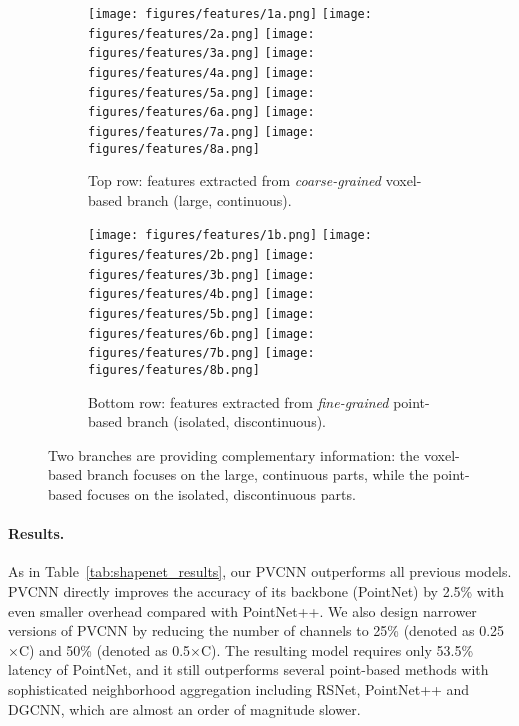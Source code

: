 \documentclass{article}
\newcommand{\tab}[1]{Table~\ref{#1}}
\newcommand{\myparagraph}[1]{\vspace{-6pt}\paragraph{#1}}
\def\modelshort{PVCNN\xspace}
\begin{document}
 \begin{figure}[!t]
\centering
\begin{subfigure}[b]{\linewidth}
    \centering
    \caption{Top row: features extracted from \emph{coarse-grained} voxel-based branch (large, continuous).}
    \texttt{[image: figures/features/1a.png]}
    \texttt{[image: figures/features/2a.png]}
    \texttt{[image: figures/features/3a.png]}
    \texttt{[image: figures/features/4a.png]}
    \texttt{[image: figures/features/5a.png]}
    \texttt{[image: figures/features/6a.png]}
    \texttt{[image: figures/features/7a.png]}
    \texttt{[image: figures/features/8a.png]}
\end{subfigure}
\begin{subfigure}[b]{\linewidth}
    \centering
    \texttt{[image: figures/features/1b.png]}
    \texttt{[image: figures/features/2b.png]}
    \texttt{[image: figures/features/3b.png]}
    \texttt{[image: figures/features/4b.png]}
    \texttt{[image: figures/features/5b.png]}
    \texttt{[image: figures/features/6b.png]}
    \texttt{[image: figures/features/7b.png]}
    \texttt{[image: figures/features/8b.png]}
    \caption{Bottom row: features extracted from \emph{fine-grained} point-based branch (isolated, discontinuous).}
\end{subfigure}
\caption{Two branches are providing complementary information: the voxel-based branch focuses on the large, continuous parts, while the point-based focuses on the isolated, discontinuous parts.}
\label{fig:shapenet_features}
\vspace{-10pt}
\end{figure} 
\myparagraph{Results.}

As in \tab{tab:shapenet_results}, our \modelshort outperforms all previous models. \modelshort directly improves the accuracy of its backbone (PointNet) by 2.5\% with even smaller overhead compared with PointNet++. We also design narrower versions of \modelshort by reducing the number of channels to 25\% (denoted as 0.25$\times$C) and 50\% (denoted as 0.5$\times$C). The resulting model requires only 53.5\% latency of PointNet, and it still outperforms several point-based methods with sophisticated neighborhood aggregation including RSNet, PointNet++ and DGCNN, which are almost an order of magnitude slower.
\end{document}
